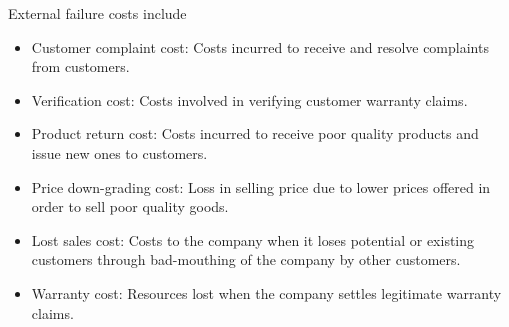 \documentclass[12pt]{article}
\begin{document}
External failure costs include
\begin{itemize}
	\item Customer complaint cost: Costs incurred to receive and resolve complaints from customers.
	\item Verification cost: Costs involved in verifying customer warranty claims.
	\item Product return cost: Costs incurred to receive poor quality products and issue new ones to customers.
	\item Price down-grading cost: Loss in selling price due to lower prices offered in order to sell poor quality goods. 
	\item Lost sales cost: Costs to the company when it loses potential or existing customers through bad-mouthing of the company by other customers.
	\item Warranty cost: Resources lost when the company settles legitimate warranty claims.
\end{itemize}
\end{document}
